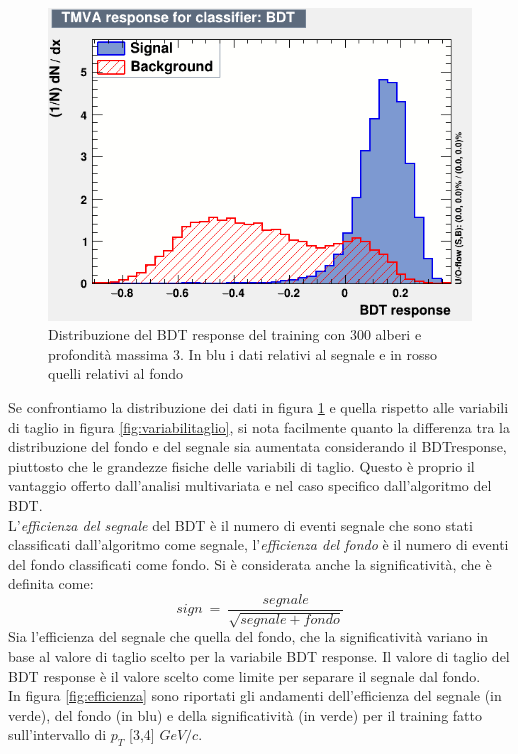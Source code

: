     \begin{figure}[htbp] 
        \centering
        \includegraphics[width=0.7\linewidth]{training&testing/BDTresponsetest.png}
        \caption{Distribuzione del BDT response del training con 300 alberi e profondità massima 3. In blu i dati relativi al segnale e in rosso quelli relativi al fondo}
        \label{fig:BDTresponse}
    \end{figure}
    
Se confrontiamo la distribuzione dei dati in figura \ref{fig:BDTresponse} e quella rispetto alle variabili di taglio in figura \ref{fig:variabilitaglio}, si nota facilmente quanto la differenza tra la distribuzione del fondo e del segnale sia aumentata considerando il BDTresponse, piuttosto che le grandezze fisiche delle variabili di taglio. Questo è proprio il vantaggio offerto dall'analisi multivariata e nel caso specifico dall'algoritmo del BDT.
\\L'\textit{efficienza del segnale} del BDT è il numero di eventi segnale che sono stati classificati dall'algoritmo come segnale, l'\textit{efficienza del fondo} è il numero di eventi del fondo classificati come fondo.
Si è considerata anche la significatività, che è definita come:
    \begin{equation}
        sign \ = \ \frac{segnale}{\sqrt{segnale + fondo}}
    \end{equation}
Sia l'efficienza del segnale che quella del fondo, che la significatività variano in base al valore di taglio scelto per la variabile BDT response. Il valore di taglio del BDT response è il valore scelto come limite per separare il segnale dal fondo.
\\In figura \ref{fig:efficienza} sono riportati gli andamenti dell'efficienza del segnale (in verde), del fondo (in blu) e della significatività (in verde) per il training fatto sull'intervallo di $p_T$ [3,4] $GeV/c$.

